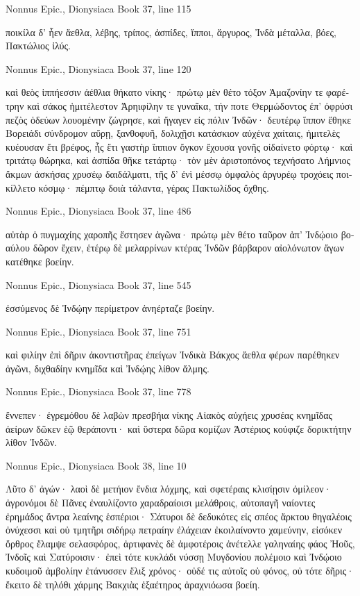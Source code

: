 \documentclass[12pt,letterpaper,twoside,final]{memoir}
\begin{document}
\begin{greek}
Nonnus Epic., Dionysiaca 
Book 37, line 115

ποικίλα δ' ἦεν ἄεθλα, λέβης, τρίπος, ἀσπίδες, ἵπποι, 
ἄργυρος, Ἰνδὰ μέταλλα, βόες, Πακτώλιος ἰλύς. 



Nonnus Epic., Dionysiaca 
Book 37, line 120

καὶ θεὸς ἱππήεσσιν ἀέθλια θήκατο νίκης· 
πρώτῳ μὲν θέτο τόξον Ἀμαζονίην τε φαρέτρην 
καὶ σάκος ἡμιτέλεστον Ἀρηιφίλην τε γυναῖκα, 
τήν ποτε Θερμώδοντος ἐπ' ὀφρύσι πεζὸς ὁδεύων 
λουομένην ζώγρησε, καὶ ἤγαγεν εἰς πόλιν Ἰνδῶν· 
δευτέρῳ ἵππον ἔθηκε Βορειάδι σύνδρομον αὔρῃ, 
ξανθοφυῆ, δολιχῇσι κατάσκιον αὐχένα χαίταις, 
ἡμιτελὲς κυέουσαν ἔτι βρέφος, ἧς ἔτι γαστὴρ   
ἵππιον ὄγκον ἔχουσα γονῆς οἰδαίνετο φόρτῳ· 
καὶ τριτάτῳ θώρηκα, καὶ ἀσπίδα θῆκε τετάρτῳ· 
τὸν μὲν ἀριστοπόνος τεχνήσατο Λήμνιος ἄκμων 
ἀσκήσας χρυσέῳ δαιδάλματι, τῆς δ' ἐνὶ μέσσῳ 
ὀμφαλὸς ἀργυρέῳ τροχόεις ποικίλλετο κόσμῳ· 
πέμπτῳ δοιὰ τάλαντα, γέρας Πακτωλίδος ὄχθης. 



Nonnus Epic., Dionysiaca 
Book 37, line 486

αὐτὰρ ὁ πυγμαχίης χαροπῆς ἔστησεν ἀγῶνα· 
πρώτῳ μὲν θέτο ταῦρον ἀπ' Ἰνδῴοιο βοαύλου 
δῶρον ἔχειν, ἑτέρῳ δὲ μελαρρίνων κτέρας Ἰνδῶν 
βάρβαρον αἰολόνωτον ἄγων κατέθηκε βοείην. 



Nonnus Epic., Dionysiaca 
Book 37, line 545

                                   ἐσσύμενος δὲ 
Ἰνδῴην περίμετρον ἀνηέρταζε βοείην. 



Nonnus Epic., Dionysiaca 
Book 37, line 751

καὶ φιλίην ἐπὶ δῆριν ἀκοντιστῆρας ἐπείγων 
Ἰνδικὰ Βάκχος ἄεθλα φέρων παρέθηκεν ἀγῶνι, 
διχθαδίην κνημῖδα καὶ Ἰνδῴης λίθον ἅλμης. 



Nonnus Epic., Dionysiaca 
Book 37, line 778

ἔννεπεν· ἐγρεμόθου δὲ λαβὼν πρεσβήια νίκης 
Αἰακὸς αὐχήεις χρυσέας κνημῖδας ἀείρων 
δῶκεν ἑῷ θεράποντι· καὶ ὕστερα δῶρα κομίζων 
Ἀστέριος κούφιζε δορικτήτην λίθον Ἰνδῶν. 



Nonnus Epic., Dionysiaca 
Book 38, line 10

Λῦτο δ' ἀγών· λαοὶ δὲ μετήιον ἔνδια λόχμης, 
καὶ σφετέραις κλισίῃσιν ὁμίλεον· ἀγρονόμοι δὲ 
Πᾶνες ἐναυλίζοντο χαραδραίοισι μελάθροις, 
αὐτοπαγῆ ναίοντες ἐρημάδος ἄντρα λεαίνης 
ἑσπέριοι· Σάτυροι δὲ δεδυκότες εἰς σπέος ἄρκτου 
θηγαλέοις ὀνύχεσσι καὶ οὐ τμητῆρι σιδήρῳ 
πετραίην ἐλάχειαν ἐκοιλαίνοντο χαμεύνην, 
εἰσόκεν ὄρθρος ἔλαμψε σελασφόρος, ἀρτιφανὲς δὲ 
ἀμφοτέροις ἀνέτελλε γαληναίης φάος Ἠοῦς, 
Ἰνδοῖς καὶ Σατύροισιν· ἐπεὶ τότε κυκλάδι νύσσῃ 
Μυγδονίου πολέμοιο καὶ Ἰνδῴοιο κυδοιμοῦ 
ἀμβολίην ἐτάνυσσεν ἕλιξ χρόνος· οὐδέ τις αὐτοῖς 
οὐ φόνος, οὐ τότε δῆρις· ἔκειτο δὲ τηλόθι χάρμης 
Βακχιὰς ἑξαέτηρος ἀραχνιόωσα βοείη. 




\end{greek}
\end{document}
